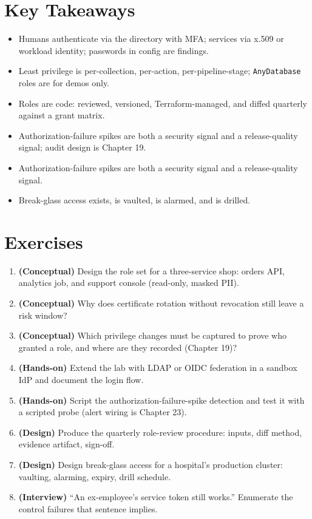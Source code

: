 \section*{Key Takeaways}
\begin{itemize}
    \item Humans authenticate via the directory with MFA; services via x.509 or workload identity; passwords in config are findings.
    \item Least privilege is per-collection, per-action, per-pipeline-stage; \texttt{AnyDatabase} roles are for demos only.
    \item Roles are code: reviewed, versioned, Terraform-managed, and diffed quarterly against a grant matrix.
    \item Authorization-failure spikes are both a security signal and a release-quality signal; audit design is Chapter 19.
    \item Authorization-failure spikes are both a security signal and a release-quality signal.
    \item Break-glass access exists, is vaulted, is alarmed, and is drilled.
\end{itemize}

\section{Exercises}
\begin{enumerate}
    \item \textbf{(Conceptual)} Design the role set for a three-service shop: orders API, analytics job, and support console (read-only, masked PII).
    \item \textbf{(Conceptual)} Why does certificate rotation without revocation still leave a risk window?
    \item \textbf{(Conceptual)} Which privilege changes must be captured to prove who granted a role, and where are they recorded (Chapter 19)?
    \item \textbf{(Hands-on)} Extend the lab with LDAP or OIDC federation in a sandbox IdP and document the login flow.
    \item \textbf{(Hands-on)} Script the authorization-failure-spike detection and test it with a scripted probe (alert wiring is Chapter 23).
    \item \textbf{(Design)} Produce the quarterly role-review procedure: inputs, diff method, evidence artifact, sign-off.
    \item \textbf{(Design)} Design break-glass access for a hospital's production cluster: vaulting, alarming, expiry, drill schedule.
    \item \textbf{(Interview)} ``An ex-employee's service token still works.'' Enumerate the control failures that sentence implies.
\end{enumerate}

